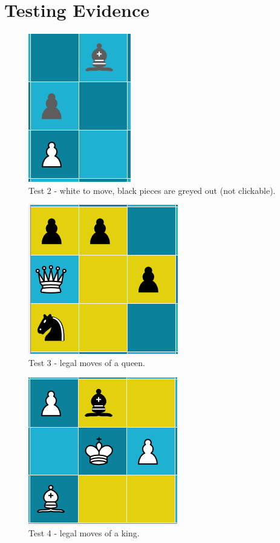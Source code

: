 \section{Testing Evidence}
\begin{figure}[H]
	\centering
	\includegraphics{images/screenshots/test-2}
	\caption{Test 2 - white to move, black pieces are greyed out (not clickable).}
	\label{test-2}
\end{figure}
\begin{figure}[H]
	\centering
	\includegraphics{images/screenshots/test-3}
	\caption{Test 3 - legal moves of a queen.}
	\label{test-3}
\end{figure}
\begin{figure}[H]
	\centering
	\includegraphics{images/screenshots/test-4}
	\caption{Test 4 - legal moves of a king.}
	\label{test-4}
\end{figure}

